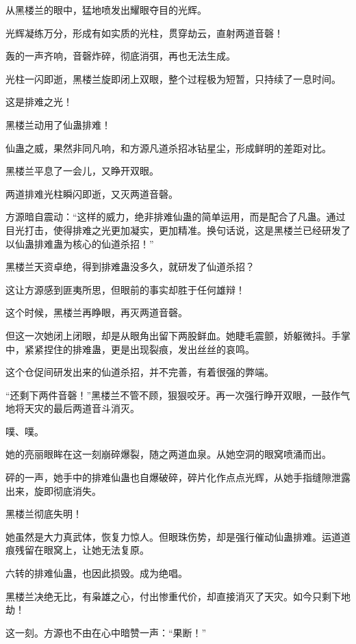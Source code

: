 
\begin{this_body}

从黑楼兰的眼中，猛地喷发出耀眼夺目的光辉。

光辉凝练万分，形成有如实质的光柱，贯穿劫云，直射两道音磬！

轰的一声齐响，音磬炸碎，彻底消弭，再也无法生成。

光柱一闪即逝，黑楼兰旋即闭上双眼，整个过程极为短暂，只持续了一息时间。

这是排难之光！

黑楼兰动用了仙蛊排难！

仙蛊之威，果然非同凡响，和方源凡道杀招冰钻星尘，形成鲜明的差距对比。

黑楼兰平息了一会儿，又睁开双眼。

两道排难光柱瞬闪即逝，又灭两道音磬。

方源暗自震动：“这样的威力，绝非排难仙蛊的简单运用，而是配合了凡蛊。通过目光打击，使得排难之光更加凝实，更加精准。换句话说，这是黑楼兰已经研发了以仙蛊排难蛊为核心的仙道杀招！”

黑楼兰天资卓绝，得到排难蛊没多久，就研发了仙道杀招？

这让方源感到匪夷所思，但眼前的事实却胜于任何雄辩！

这个时候，黑楼兰再睁眼，再灭两道音磬。

但这一次她闭上闭眼，却是从眼角出留下两股鲜血。她睫毛震颤，娇躯微抖。手掌中，紧紧捏住的排难蛊，更是出现裂痕，发出丝丝的哀鸣。

这个仓促间研发出来的仙道杀招，并不完善，有着很强的弊端。

“还剩下两件音磬！”黑楼兰不管不顾，狠狠咬牙。再一次强行睁开双眼，一鼓作气地将天灾的最后两道音斗消灭。

噗、噗。

她的亮丽眼眸在这一刻崩碎爆裂，随之两道血泉。从她空洞的眼窝喷涌而出。

砰的一声，她手中的排难仙蛊也自爆破碎，碎片化作点点光辉，从她手指缝隙泄露出来，旋即彻底消失。

黑楼兰彻底失明！

她虽然是大力真武体，恢复力惊人。但眼珠伤势，却是强行催动仙蛊排难。运道道痕残留在眼窝上，让她无法复原。

六转的排难仙蛊，也因此损毁。成为绝唱。

黑楼兰决绝无比，有枭雄之心，付出惨重代价，却直接消灭了天灾。如今只剩下地劫！

这一刻。方源也不由在心中暗赞一声：“果断！”


\end{this_body}
